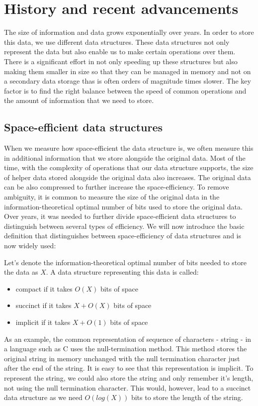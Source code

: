 \chapter{History and recent advancements}
\label{kap:kap1}

The size of information and data grows exponentially over years. In order to store this data, we use different data structures. These data structures not only represent the data but also enable us to make certain operations over them. There is a significant effort in not only speeding up these structures but also making them smaller in size so that they can be managed in memory and not on a secondary data storage thas is often orders of magnitude times slower. The key factor is to find the right balance between the speed of common operations and the amount of information that we need to store.

\section{Space-efficient data structures}

When we measure how space-efficient the data structure is, we often measure this in additional information that we store alongside the original data. Most of the time, with the complexity of operations that our data structure supports, the size of helper data stored alongside the original data also increases. The original data can be also compressed to further increase the space-efficiency. To remove ambiguity, it is common to measure the size of the original data in the information-theoretical optimal number of bits used to store the original data. Over years, it was needed to further divide space-efficient data structures to distinguish between several types of efficiency. We will now introduce the basic definition that distinguishes between space-efficiency of data structures and is now widely used:

Let's denote the information-theoretical optimal number of bits needed to store the data as $X$. A data structure representing this data is called:
\begin{itemize}
\item compact if it takes $O(X)$ bits of space
\item succinct if it takes $X + O(X)$ bits of space
\item implicit if it takes $X + O(1)$ bits of space
\end{itemize}

As an example, the common representation of sequence of characters - string - in a language such as C uses the null-termination method. This method stores the original string in memory unchanged with the null termination character just after the end of the string. It is easy to see that this representation is implicit. To represent the string, we could also store the string and only remember it's length, not using the null termination character. This would, however, lead to a succinct data structure as we need $O(log(X))$ bits to store the length of the string.

